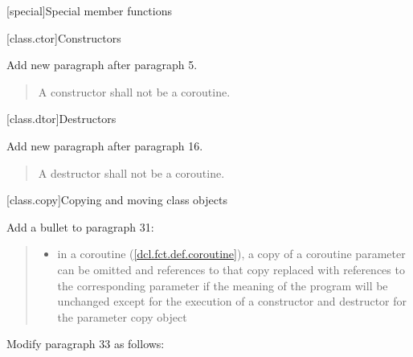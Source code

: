 
\setcounter{chapter}{11}
\begingroup
\renewcommand{\cleardoublepage}{}
\renewcommand{\clearpage}{}
[special]{Special member functions}
\endgroup

\setcounter{section}{0}
[class.ctor]{Constructors}%

Add new paragraph after paragraph 5.

	\setcounter{Paras}{5}
\begin{quote}
	\pnum A constructor shall not be a coroutine.
\end{quote}

\setcounter{section}{3}
[class.dtor]{Destructors}%

Add new paragraph after paragraph 16.

	\setcounter{Paras}{16}
\begin{quote}
	\pnum A destructor shall not be a coroutine.
\end{quote}

\setcounter{section}{7}
[class.copy]{Copying and moving class objects}%

Add a bullet to paragraph 31:

\begin{quote}
\begin{itemize}
	\item in a coroutine (\ref{dcl.fct.def.coroutine}), a copy of a coroutine parameter  can be omitted
	and references to that copy replaced with references to the corresponding parameter if the meaning of the program will
	be unchanged except for the execution of a constructor and destructor for the parameter copy object
\end{itemize}
\end{quote} 

Modify paragraph 33 as follows:

